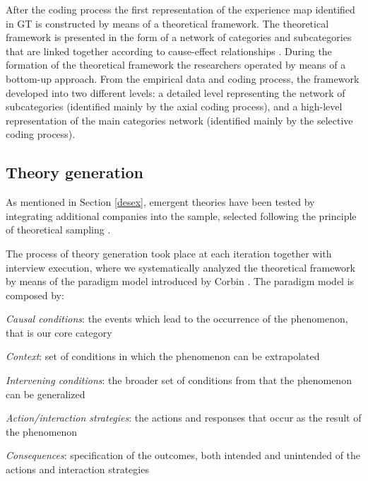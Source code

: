 \documentclass[10pt,journal,letterpaper,compsoc]{IEEEtran}
\begin{document}
After the coding process the first representation of the experience map identified in GT is constructed by means of a theoretical framework. The theoretical framework is presented in the form of a network of categories and subcategories that are linked together according to cause-effect relationships \cite{Corbin1990}. During the formation of the theoretical framework the researchers operated by means of a  bottom-up approach. From the empirical data and coding process, the framework developed into two different levels: a detailed level representing the network of subcategories (identified mainly by the axial coding process), and a high-level representation of the main categories network (identified mainly by the selective coding process).

\subsection{Theory generation}

As mentioned in Section \ref{desex}, emergent theories have been tested by integrating additional companies into the sample, selected following the principle of theoretical sampling \cite{Yin1994}. 

The process of theory generation took place at each iteration together with interview execution, where we systematically analyzed the theoretical framework by means of the paradigm model introduced by Corbin \cite{Corbin1990}. The paradigm model is composed by: 

\begin{compactitem}
\item \textit{Causal conditions}: the events which lead to the occurrence of the phenomenon, that is our core category
\item \textit{Context}: set of conditions in which the phenomenon can be extrapolated
\item \textit{Intervening conditions}: the broader set of conditions from that the phenomenon can be generalized
\item \textit{Action/interaction strategies}: the actions and responses that occur as the result of the phenomenon
\item \textit{Consequences}: specification of the outcomes, both intended and unintended of the actions and interaction strategies
\end{compactitem}
\end{document}
